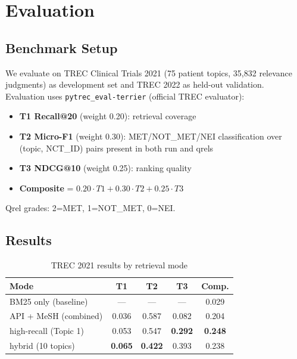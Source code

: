 \documentclass[10pt,twocolumn]{article}
\begin{document}
\section{Evaluation}
\label{sec:eval}

\subsection{Benchmark Setup}

We evaluate on TREC Clinical Trials 2021 (75 patient topics, 35,832 relevance judgments)
as development set and TREC 2022 as held-out validation. Evaluation uses
\texttt{pytrec\_eval-terrier} (official TREC evaluator):

\begin{itemize}[leftmargin=*, noitemsep, topsep=2pt]
  \item \textbf{T1 Recall@20} (weight 0.20): retrieval coverage
  \item \textbf{T2 Micro-F1} (weight 0.30): MET/NOT\_MET/NEI classification over
    (topic, NCT\_ID) pairs present in both run and qrels
  \item \textbf{T3 NDCG@10} (weight 0.25): ranking quality
  \item \textbf{Composite} = $0.20 \cdot T1 + 0.30 \cdot T2 + 0.25 \cdot T3$
\end{itemize}

Qrel grades: 2=MET, 1=NOT\_MET, 0=NEI.

\subsection{Results}

\begin{table}[H]
\centering
\caption{TREC 2021 results by retrieval mode}
\label{tab:results}
\small
\begin{tabular}{lcccc}
\toprule
\textbf{Mode} & \textbf{T1} & \textbf{T2} & \textbf{T3} & \textbf{Comp.} \\
\midrule
BM25 only (baseline) & — & — & — & 0.029 \\
API + MeSH (combined) & 0.036 & 0.587 & 0.082 & 0.204 \\
high-recall (Topic 1) & 0.053 & 0.547 & \textbf{0.292} & \textbf{0.248} \\
hybrid (10 topics) & \textbf{0.065} & \textbf{0.422} & 0.393 & 0.238 \\
\bottomrule
\end{tabular}
\end{table}
\end{document}
